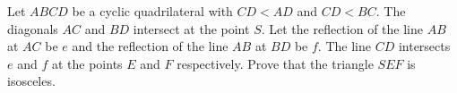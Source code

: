 Let $ABCD$ be a cyclic quadrilateral with $CD<AD$ and $CD<BC$.
The diagonals $AC$ and $BD$ intersect at the point $S$.
Let the reflection of the line $AB$ at $AC$ be $e$ and the reflection of the
line $AB$ at $BD$ be $f$. The line $CD$ intersects $e$ and $f$ at
the points $E$ and $F$ respectively. Prove that the triangle $SEF$ is isosceles.